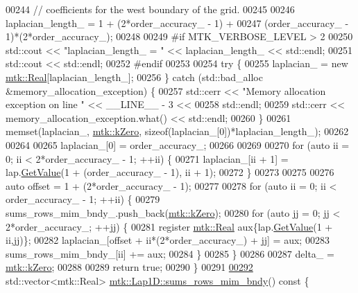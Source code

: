 \begin{DoxyCode}
00244   \textcolor{comment}{// coefficients for the west boundary of the grid.}
00245 
00246   laplacian\_length\_ = 1 + (2*order\_accuracy\_ - 1) +
00247     (order\_accuracy\_ - 1)*(2*order\_accuracy\_);
00248 
00249 \textcolor{preprocessor}{  #if MTK\_VERBOSE\_LEVEL > 2}
00250   std::cout << \textcolor{stringliteral}{"laplacian\_length\_ = "} << laplacian\_length\_ << std::endl;
00251   std::cout << std::endl;
00252 \textcolor{preprocessor}{  #endif}
00253 
00254   \textcolor{keywordflow}{try} \{
00255     laplacian\_ = \textcolor{keyword}{new} \hyperlink{group__c01-roots_gac080bbbf5cbb5502c9f00405f894857d}{mtk::Real}[laplacian\_length\_];
00256   \} \textcolor{keywordflow}{catch} (std::bad\_alloc &memory\_allocation\_exception) \{
00257     std::cerr << \textcolor{stringliteral}{"Memory allocation exception on line "} << \_\_LINE\_\_ - 3 <<
00258       std::endl;
00259     std::cerr << memory\_allocation\_exception.what() << std::endl;
00260   \}
00261   memset(laplacian\_, \hyperlink{group__c01-roots_ga59a451a5fae30d59649bcda274fea271}{mtk::kZero}, \textcolor{keyword}{sizeof}(laplacian\_[0])*laplacian\_length\_);
00262 
00264 
00265   laplacian\_[0] = order\_accuracy\_;
00266 
00269 
00270   \textcolor{keywordflow}{for} (\textcolor{keyword}{auto} ii = 0; ii < 2*order\_accuracy\_ - 1; ++ii) \{
00271     laplacian\_[ii + 1] = lap.\hyperlink{classmtk_1_1DenseMatrix_a4b23ecbebd970b5eea915dbb50691024}{GetValue}(1 + (order\_accuracy\_ - 1), ii + 1);
00272   \}
00273 
00275 
00276   \textcolor{keyword}{auto} offset = 1 + (2*order\_accuracy\_ - 1);
00277 
00278   \textcolor{keywordflow}{for} (\textcolor{keyword}{auto} ii = 0; ii < order\_accuracy\_ - 1; ++ii) \{
00279     sums\_rows\_mim\_bndy\_.push\_back(\hyperlink{group__c01-roots_ga59a451a5fae30d59649bcda274fea271}{mtk::kZero});
00280     \textcolor{keywordflow}{for} (\textcolor{keyword}{auto} jj = 0; jj < 2*order\_accuracy\_; ++jj) \{
00281       \textcolor{keyword}{register} \hyperlink{group__c01-roots_gac080bbbf5cbb5502c9f00405f894857d}{mtk::Real} aux\{lap.\hyperlink{classmtk_1_1DenseMatrix_a4b23ecbebd970b5eea915dbb50691024}{GetValue}(1 + ii,jj)\};
00282       laplacian\_[offset + ii*(2*order\_accuracy\_) + jj] = aux;
00283       sums\_rows\_mim\_bndy\_[ii] += aux;
00284     \}
00285   \}
00286 
00287   delta\_ = \hyperlink{group__c01-roots_ga59a451a5fae30d59649bcda274fea271}{mtk::kZero};
00288 
00289   \textcolor{keywordflow}{return} \textcolor{keyword}{true};
00290 \}
00291 
\hypertarget{mtk__lap__1d_8cc_source_l00292}{}\hyperlink{classmtk_1_1Lap1D_ad0f976d32700cd8b46aa99f5a8d9e38b}{00292} std::vector<mtk::Real> \hyperlink{classmtk_1_1Lap1D_ad0f976d32700cd8b46aa99f5a8d9e38b}{mtk::Lap1D::sums\_rows\_mim\_bndy}()\textcolor{keyword}{ const }\{

\end{DoxyCode}
